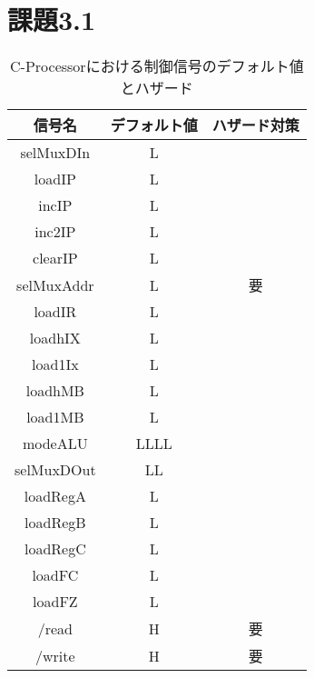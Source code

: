 \documentclass[dvipdfmx]{jarticle}
\begin{document}
\section{課題3.1}
\begin{table}[h]
    \centering
    \begin{tabular}{|c|c|c|}
    \hline
    信号名 & デフォルト値 & ハザード対策\\\hline
    selMuxDIn&L&\\
    loadIP&L&\\
    incIP&L&\\
    inc2IP&L&\\
    clearIP&L&\\
    selMuxAddr&L&要\\
    loadIR&L&\\
    loadhIX&L&\\
    load1Ix&L&\\
    loadhMB&L&\\
    load1MB&L&\\
    modeALU&LLLL&\\
    selMuxDOut&LL&\\
    loadRegA&L&\\
    loadRegB&L&\\
    loadRegC&L&\\
    loadFC&L&\\
    loadFZ&L&\\
    /read&H&要\\
    /write&H &要\\
    \hline
    \end{tabular}
    \caption{C-Processorにおける制御信号のデフォルト値とハザード}
\end{table}
\end{document}
